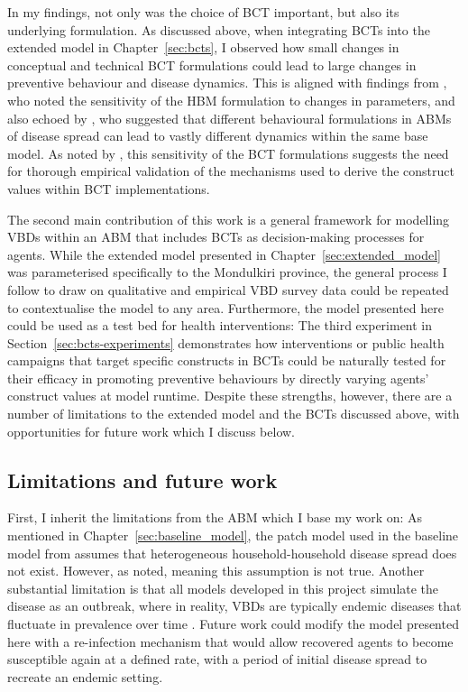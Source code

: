 In my findings, not only was the choice of BCT important, but also its underlying formulation. As discussed above, when integrating BCTs into the extended model in Chapter~\ref{sec:bcts}, I observed how small changes in conceptual and technical BCT formulations could lead to large changes in preventive behaviour and disease dynamics. This is aligned with findings from \citet{durham_incorporating_2012}, who noted the sensitivity of the HBM formulation to changes in parameters, and also echoed by \citet{scheidegger_agent-based_2017}, who suggested that different behavioural formulations in ABMs of disease spread can lead to vastly different dynamics within the same base model. As noted by \citet{kurchyna_seeing_2024}, this sensitivity of the BCT formulations suggests the need for thorough empirical validation of the mechanisms used to derive the construct values within BCT implementations.

The second main contribution of this work is a general framework for modelling VBDs within an ABM that includes BCTs as decision-making processes for agents. While the extended model presented in Chapter~\ref{sec:extended_model} was parameterised specifically to the Mondulkiri province, the general process I follow to draw on qualitative and empirical VBD survey data could be repeated to contextualise the model to any area. Furthermore, the model presented here could be used as a test bed for health interventions: The third experiment in Section~\ref{sec:bcts-experiments} demonstrates how interventions or public health campaigns that target specific constructs in BCTs could be naturally tested for their efficacy in promoting preventive behaviours by directly varying agents' construct values at model runtime. Despite these strengths, however, there are a number of limitations to the extended model and the BCTs discussed above, with opportunities for future work which I discuss below.

\subsection{Limitations and future work}

First, I inherit the limitations from the ABM which I base my work on: As mentioned in Chapter~\ref{sec:baseline_model}, the patch model used in the baseline model from \citet{manore_network-patch_2015} assumes that heterogeneous household-household disease spread does not exist. However, as \citet{pepey_mobility_2022} noted,  meaning this assumption is not true. Another substantial limitation is that all models developed in this project simulate the disease as an outbreak, where in reality, VBDs are typically endemic diseases that fluctuate in prevalence over time \cite{bhatia_vector-borne_2014}. Future work could modify the model presented here with a re-infection mechanism that would allow recovered agents to become susceptible again at a defined rate, with a  period of initial disease spread to recreate an endemic setting.

